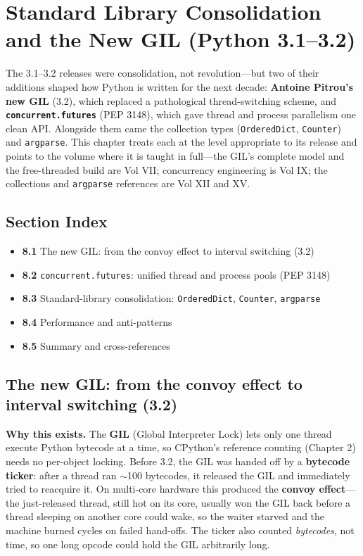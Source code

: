 \chapter{Standard Library Consolidation and the New GIL (Python 3.1--3.2)}

The 3.1--3.2 releases were consolidation, not revolution---but two of their additions shaped how
Python is written for the next decade: \textbf{Antoine Pitrou's new GIL} (3.2), which replaced a
pathological thread-switching scheme, and \textbf{\texttt{concurrent.futures}} (PEP 3148), which
gave thread and process parallelism one clean API. Alongside them came the collection types
(\texttt{OrderedDict}, \texttt{Counter}) and \texttt{argparse}. This chapter treats each at the
level appropriate to its release and points to the volume where it is taught in full---the GIL's
complete model and the free-threaded build are Vol VII; concurrency engineering is Vol IX; the
collections and \texttt{argparse} references are Vol XII and XV.

\section*{Section Index}
\begin{itemize}
  \item \textbf{8.1} The new GIL: from the convoy effect to interval switching (3.2)
  \item \textbf{8.2} \texttt{concurrent.futures}: unified thread and process pools (PEP 3148)
  \item \textbf{8.3} Standard-library consolidation: \texttt{OrderedDict}, \texttt{Counter}, \texttt{argparse}
  \item \textbf{8.4} Performance and anti-patterns
  \item \textbf{8.5} Summary and cross-references
\end{itemize}

\section{The new GIL: from the convoy effect to interval switching (3.2)}

\textbf{Why this exists.} The \textbf{GIL} (Global Interpreter Lock) lets only one thread execute
Python bytecode at a time, so CPython's reference counting (Chapter 2) needs no per-object
locking. Before 3.2, the GIL was handed off by a \textbf{bytecode ticker}: after a thread ran
$\sim$100 bytecodes, it released the GIL and immediately tried to reacquire it. On multi-core
hardware this produced the \textbf{convoy effect}---the just-released thread, still hot on its
core, usually won the GIL back before a thread sleeping on another core could wake, so the waiter
starved and the machine burned cycles on failed hand-offs. The ticker also counted
\emph{bytecodes}, not time, so one long opcode could hold the GIL arbitrarily long.

